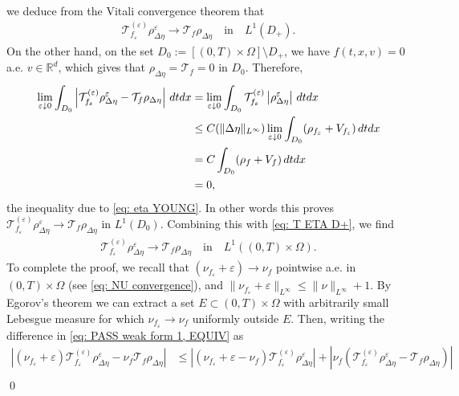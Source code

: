 \documentclass[10pt,a4paper]{amsart}
\newcommand{\R}{\mathbb{R}}
\newcommand{\calT}{\mathcal T}
\newcommand{\dt}{\textnormal{d}t}
\newcommand{\dx}{\textnormal{d}x}
\newcommand{\lt}{\left}
\renewenvironment{proof}[1][\proofname]{\noindent{\scshape #1.\quad}}{\qed}
\newcommand{\rt}{\right}
\newcommand{\ve}{\varepsilon}
\begin{document}
\begin{proof}
\begin{align*}
\end{align*}
we deduce from the Vitali convergence theorem that
\begin{align}\label{eq: T ETA D+}
    \calT_{f_\ve}^{(\ve)} \rho_{\Delta\eta}^\ve \to \calT_{f} \rho_{\Delta\eta} \quad \text{in} \quad L^1(D_+).
\end{align}
On the other hand, on the set $D_0 := [(0,T)\times \Omega]\setminus D_+$, we have $f(t,x,v) = 0$ a.e. $v\in \R^d$, which gives that $\rho_{\Delta\eta} = \calT_f = 0$ in $D_0$. Therefore, 
\begin{equation} \label{eq: T ETA D0}
\begin{split}
    \lim_{\ve\downarrow 0} \int_{D_0} \lt| \calT_{f_\ve}^{(\ve)} \rho_{\Delta\eta}^\ve - \calT_f \rho_{\Delta\eta} \rt| \,\dt\dx &= \lim_{\ve\downarrow 0}\int_{D_0} \calT_{f_\ve}^{(\ve)} \lt|\rho_{\Delta\eta}^\ve \rt| \,\dt\dx \\
    &\le C(\|\Delta\eta\|_{L^\infty}) \lim_{\ve\downarrow 0} \int_{D_0} (\rho_{f_\ve} + V_{f_\ve}) \,\dt\dx\\
    &= C \int_{D_0} (\rho_f + V_f) \,\dt\dx\\
    &= 0,
\end{split}
\end{equation}
the inequality due to \eqref{eq: eta YOUNG}. In other words this proves $\calT_{f_\ve}^{(\ve)} \rho_{\Delta\eta}^\ve \to \calT_f \rho_{\Delta\eta}$ in $L^1(D_0)$. Combining this with \eqref{eq: T ETA D+}, we find
\begin{align}\label{eq: PASS prod T eta}
    \calT_{f_\ve}^{(\ve)} \rho_{\Delta\eta}^\ve \to \calT_f \rho_{\Delta\eta} \quad \text{in} \quad L^1((0,T)\times\Omega).
\end{align}
To complete the proof, we recall that $(\nu_{f_\ve} + \ve) \to \nu_f$ pointwise a.e. in $(0,T)\times \Omega$ (see \eqref{eq: NU convergence}), and $\|\nu_{f_\ve} + \ve\|_{L^\infty} \le \|\nu\|_{L^\infty} + 1$. By Egorov's theorem we can extract a set $E\subset (0,T)\times\Omega$ with arbitrarily small Lebesgue measure for which $\nu_{f_\ve} \to \nu_f$ uniformly outside $E$. Then, writing the difference in \eqref{eq: PASS weak form 1, EQUIV} as
\begin{equation} \label{eq: j1 j2}
\begin{split}
     \lt|(\nu_{f_\ve} + \ve) \calT_{f_\ve}^{(\ve)} \rho_{\Delta\eta}^\ve - \nu_f \calT_f \rho_{\Delta\eta} \rt|  
    &\le \lt| (\nu_{f_\ve} + \ve - \nu_f)  \calT_{f_\ve}^{(\ve)} \rho_{\Delta\eta}^\ve \rt| + \lt|\nu_f \lt( \calT_{f_\ve}^{(\ve)} \rho_{\Delta\eta}^\ve - \calT_f \rho_{\Delta\eta} \rt) \rt|\\

\end{split}
\end{equation}
\end{proof}
\end{document}
